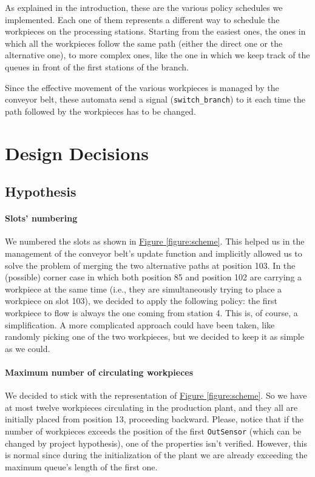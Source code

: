 \documentclass[a4paper,twoside]{article}
\newcommand{\figureref}[1]{\textsf{\hyperref[#1]{Figure \ref*{#1}}}}
\begin{document}
    As explained in the introduction, these are the various policy schedules we implemented. Each one of them represents a different way to schedule the workpieces on the processing stations. Starting from the easiest ones, the ones in which all the workpieces follow the same path (either the direct one or the alternative one), to more complex ones, like the one in which we keep track of the queues in front of the first stations of the branch.\medskip

    Since the effective movement of the various workpieces is managed by the conveyor belt, these automata send a signal (\texttt{switch\_branch}) to it each time the path followed by the workpieces has to be changed.

    \section{D\lowercase{esign} D\lowercase{ecisions}} \label{section:design_decisions}

    \subsection{Hypothesis}

    \paragraph{Slots' numbering} We numbered the slots as shown in \figureref{figure:scheme}. This helped us in the management of the conveyor belt's update function and implicitly allowed us to solve the problem of merging the two alternative paths at position 103. In the (possible) corner case in which both position 85 and position 102 are carrying a workpiece at the same time (i.e., they are simultaneously trying to place a workpiece on slot 103), we decided to apply the following policy: the first workpiece to flow is always the one coming from station 4. This is, of course, a simplification. A more complicated approach could have been taken, like randomly picking one of the two workpieces, but we decided to keep it as simple as we could.

    \paragraph{Maximum number of circulating workpieces} We decided to stick with the representation of \figureref{figure:scheme}. So we have at most twelve workpieces circulating in the production plant, and they all are initially placed from position 13, proceeding backward. Please, notice that if the number of workpieces exceeds the position of the first \texttt{OutSensor} (which can be changed by project hypothesis), one of the properties isn't verified. However, this is normal since during the initialization of the plant we are already exceeding the maximum queue's length of the first one.
\end{document}
